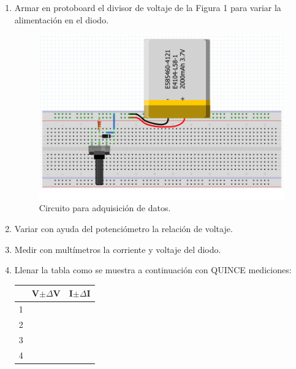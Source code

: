 \documentclass[letterpaper, 12 pt, conference]{ieeeconf}  %
\begin{document}
\begin{enumerate}
    \item Armar en protoboard el divisor de voltaje de la Figura 1 para variar la alimentación en el diodo.
\begin{figure}[h!]
    \centering
    \includegraphics[scale=0.5]{B1.png}
    \caption{Circuito para adquisición de datos.}
\end{figure}
    
    \item Variar con ayuda del potenciómetro la relación de voltaje.
    \item Medir con multímetros la corriente y voltaje del diodo.
    \item Llenar la tabla como se muestra a continuación con QUINCE mediciones:
    
    
    \begin{table}[h!]
    \centering
    \begin{tabular}{|c|l|l|}
    \hline
    \multicolumn{1}{|l|}{\textbf{}} & \textbf{V$\pm\Delta$V} & \textbf{I$\pm\Delta$I} \\ \hline 
    1                               &                  &                  \\ \hline
    2                               &                  &                  \\ \hline
    3                               &                  &                  \\ \hline
    4                               &                  &                  \\ \hline
    \end{tabular}
    \end{table}
    

\end{enumerate}
\end{document}
